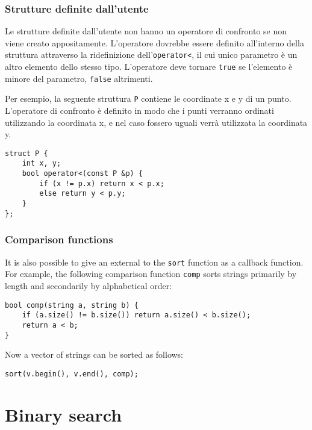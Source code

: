 \subsubsection{Strutture definite dall'utente}

Le strutture definite dall'utente non hanno
un operatore di confronto se non viene creato appositamente.
L'operatore dovrebbe essere definito all'interno 
della struttura attraverso la ridefinizione dell'\texttt{operator<},
il cui unico parametro è un altro elemento dello stesso tipo.
L'operatore deve tornare \texttt{true}
se l'elemento è minore del parametro,
\texttt{false} altrimenti.

Per esempio, la seguente struttura \texttt{P}
contiene le coordinate x e y di un punto.
L'operatore di confronto è definito in modo che i 
punti verranno ordinati utilizzando la coordinata x,
e nel caso fossero uguali verrà utilizzata la coordinata y.

\begin{lstlisting}
struct P {
    int x, y;
    bool operator<(const P &p) {
        if (x != p.x) return x < p.x;
        else return y < p.y;
    }
};
\end{lstlisting}

\subsubsection{Comparison functions}


It is also possible to give an external
 to the \texttt{sort} function
as a callback function.
For example, the following comparison function \texttt{comp}
sorts strings primarily by length and secondarily
by alphabetical order:

\begin{lstlisting}
bool comp(string a, string b) {
    if (a.size() != b.size()) return a.size() < b.size();
    return a < b;
}
\end{lstlisting}
Now a vector of strings can be sorted as follows:
\begin{lstlisting}
sort(v.begin(), v.end(), comp);
\end{lstlisting}

\section{Binary search}


